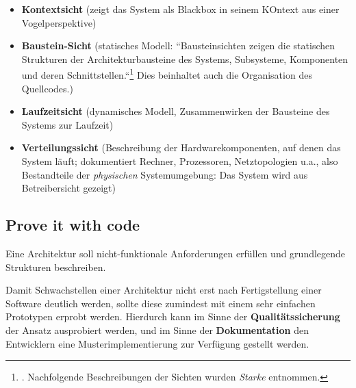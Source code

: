 \begin{itemize}
    \item \textbf{Kontextsicht} (zeigt das System als Blackbox in seinem KOntext aus einer Vogelperspektive)
    \item \textbf{Baustein-Sicht} (statisches Modell: ``Bausteinsichten zeigen die statischen Strukturen der Architekturbausteine des Systems, Subsysteme, Komponenten und deren Schnittstellen.``\footnote{
        \cite[81]{Sta14e}.
        Nachfolgende Beschreibungen der Sichten wurden \textit{Starke} entnommen.
    } Dies beinhaltet auch die Organisation des Quellcodes.)
    \item \textbf{Laufzeitsicht} (dynamisches Modell, Zusammenwirken der Bausteine des Systems zur Laufzeit)
    \item \textbf{Verteilungssicht} (Beschreibung der Hardwarekomponenten, auf denen das System läuft; dokumentiert Rechner, Prozessoren, Netztopologien u.a., also Bestandteile der \textit{physischen} Systemumgebung: Das System wird aus Betreibersicht gezeigt)
\end{itemize}

\subsection*{Prove it with code}

\begin{tcolorbox}
    Eine Architektur soll nicht-funktionale Anforderungen erfüllen und grundlegende Strukturen beschreiben.
\end{tcolorbox}

\noindent
Damit Schwachstellen einer Architektur nicht erst nach Fertigstellung einer Software deutlich werden, sollte diese zumindest mit einem sehr einfachen Prototypen erprobt werden.
Hierdurch kann im Sinne der \textbf{Qualitätssicherung} der Ansatz ausprobiert werden, und im Sinne der \textbf{Dokumentation} den Entwicklern eine Musterimplementierung zur Verfügung gestellt werden.